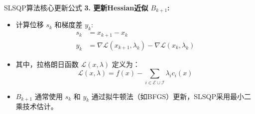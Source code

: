 \documentclass[9pt]{beamer}
\begin{document}
\begin{frame}{SLSQP算法核心更新公式}
    \textbf{3. 更新Hessian近似 $B_{k+1}$:}
    \begin{itemize}
        \item 计算位移 $s_k$ 和梯度差 $y_k$:
            \begin{align*}
            s_k &= x_{k+1} - x_k \\
            y_k &= \nabla \mathcal{L}(x_{k+1}, \lambda_k) - \nabla \mathcal{L}(x_k, \lambda_k)
            \end{align*}
        \item 其中，拉格朗日函数 $\mathcal{L}(x, \lambda)$ 定义为：
            \begin{equation*}
            \mathcal{L}(x, \lambda) = f(x) - \sum_{i \in \mathcal{E} \cup \mathcal{I}} \lambda_i c_i(x)
            \end{equation*}
        \item $B_{k+1}$ 通常使用 $s_k$ 和 $y_k$ 通过拟牛顿法（如BFGS）更新，SLSQP采用最小二乘技术估计。
    \end{itemize}

\end{frame}
\end{document}
